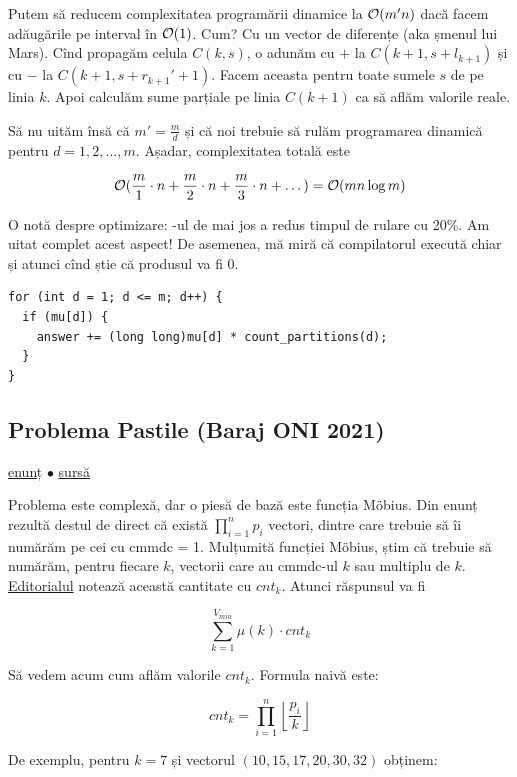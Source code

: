 \documentclass[../main.tex]{subfiles}
\begin{document}
Putem să reducem complexitatea programării dinamice la $\mathcal{O}(m'n)$ dacă facem adăugările pe interval în $\mathcal{O}(1)$. Cum? Cu un vector de diferențe (aka șmenul lui Mars). Cînd propagăm celula $C(k,s)$, o adunăm cu $+$ la $C(k+1, s + l_{k+1})$ și cu $-$ la $C(k+1, s + r_{k+1}' + 1)$. Facem aceasta pentru toate sumele $s$ de pe linia $k$. Apoi calculăm sume parțiale pe linia $C(k + 1)$ ca să aflăm valorile reale.

Să nu uităm însă că $m' = \frac{m}{d}$ și că noi trebuie să rulăm programarea dinamică pentru $d = 1, 2, \dots, m$. Așadar, complexitatea totală este

$$\mathcal{O}(\frac{m}{1} \cdot n + \frac{m}{2} \cdot n + \frac{m}{3} \cdot n + \dots) = \mathcal{O}(mn \log m)$$

O notă despre optimizare: -ul de mai jos a redus timpul de rulare cu 20\%. Am uitat complet acest aspect! De asemenea, mă miră că compilatorul execută  chiar și atunci cînd știe că produsul va fi 0.

\begin{verbatim}
for (int d = 1; d <= m; d++) {
  if (mu[d]) {
    answer += (long long)mu[d] * count_partitions(d);
  }
}
\end{verbatim}


\subsection{Problema Pastile (Baraj ONI 2021)}
\label{problem:pastile}

\href{https://kilonova.ro/problems/69}{enunț}
$\bullet$
\hyperref[code:pastile]{sursă}

Problema este complexă, dar o piesă de bază este funcția Möbius. Din enunț rezultă destul de direct că există $\prod_{i=1}^{n} p_i$ vectori, dintre care trebuie să îi numărăm pe cei cu cmmdc = 1. Mulțumită funcției Möbius, știm că trebuie să numărăm, pentru fiecare $k$, vectorii care au cmmdc-ul $k$ sau multiplu de $k$. \href{https://drive.google.com/drive/folders/1lug67SRVk6iLzgRbgBwdFzLMHDgWxh57}{Editorialul} notează această cantitate cu $cnt_{k}$. Atunci răspunsul va fi

$$\sum_{k=1}^{V_{min}} \mu(k) \cdot cnt_{k}$$

Să vedem acum cum aflăm valorile $cnt_k$. Formula naivă este:

$$cnt_k = \prod_{i=1}^{n} \left\lfloor \frac{p_i}{k} \right\rfloor$$

De exemplu, pentru $k=7$ și vectorul $(10, 15, 17, 20, 30, 32)$ obținem:
\end{document}
